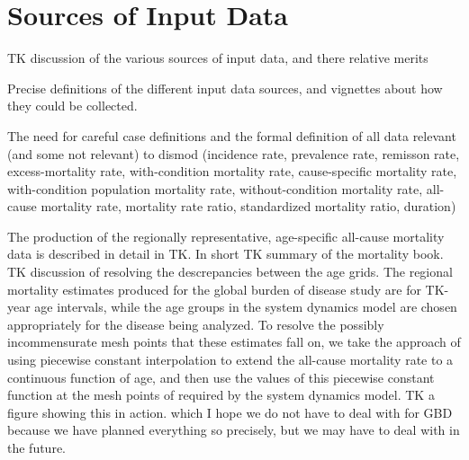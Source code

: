 \section{Sources of Input Data}

TK discussion of the various sources of input data, and there relative
merits

 Precise definitions of the different input data sources, and
 vignettes about how they could be collected.

The need for careful case definitions and the formal definition of all
data relevant (and some not relevant) to dismod (incidence rate,
prevalence rate, remisson rate, excess-mortality rate, with-condition
mortality rate, cause-specific mortality rate, with-condition
population mortality rate, without-condition mortality rate, all-cause
mortality rate, mortality rate ratio, standardized mortality ratio,
duration)

The production of the regionally representative, age-specific
all-cause mortality data is described in detail in TK. In short TK
summary of the mortality book. TK discussion of resolving the
descrepancies between the age grids. The regional mortality estimates
produced for the global burden of disease study are for TK-year age
intervals, while the age groups in the system dynamics model are
chosen appropriately for the disease being analyzed. To resolve the
possibly incommensurate mesh points that these estimates fall on, we
take the approach of using piecewise constant interpolation to extend
the all-cause mortality rate to a continuous function of age, and then
use the values of this piecewise constant function at the mesh points
of required by the system dynamics model. TK a figure showing this in
action. which I hope we do not have to deal with for GBD because we
have planned everything so precisely, but we may have to deal with in
the future.
